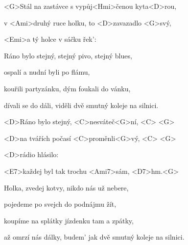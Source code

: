

\zs
<G>Stál na zastávce s vypůj<Hmi>čenou kyta<D>rou,

v <Ami>druhý ruce holku, to <D>zavazadlo <G>svý,

<Emi>a tý holce v sáčku řek': 
\ks

\zs
Ráno bylo stejný, stejný pivo, stejný blues,

ospalí a nudní byli po flámu,

kouřili partyzánku, dým foukali do vánku,

dívali se do dáli, viděli dvě smutný koleje na silnici.
\ks

\zr
<D>Ráno bylo stejný, <C>nesváteč<G>ní, <C> <G>

<D>na tvářích počasí <C>proměnli<G>vý, <C> <G>

<D>rádio hlásilo: 

<E7>každej byl tak trochu <Ami7>sám, <D7>hm.<G>
\kr

\zs
Holka, zvedej kotvy, nikdo nás už nebere,

pojedeme po svejch do podnájmu žít,

koupíme na splátky jízdenku tam a zpátky,

až omrzí nás dálky, budem' jak dvě smutný koleje na silnici.
\ks

\zr	\kr

\kp






















